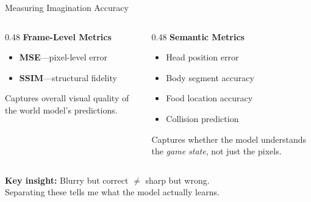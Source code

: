 \documentclass[aspectratio=169]{beamer}
\begin{document}
\begin{frame}{Measuring Imagination Accuracy}
\begin{columns}
\begin{column}{0.48\textwidth}
\textbf{Frame-Level Metrics}
\begin{itemize}
    \item \textbf{MSE}---pixel-level error
    \item \textbf{SSIM}---structural fidelity
\end{itemize}
\vspace{0.5em}
Captures overall visual quality of the world model's predictions.
\end{column}
\begin{column}{0.48\textwidth}
\textbf{Semantic Metrics}
\begin{itemize}
    \item Head position error
    \item Body segment accuracy
    \item Food location accuracy
    \item Collision prediction
\end{itemize}
\vspace{0.5em}
Captures whether the model understands the \textit{game state}, not just the pixels.
\end{column}
\end{columns}

\vspace{1em}
\begin{center}
\textbf{Key insight:} Blurry but correct $\neq$ sharp but wrong.\\
Separating these tells me what the model actually learns.
\end{center}
\end{frame}
\end{document}
